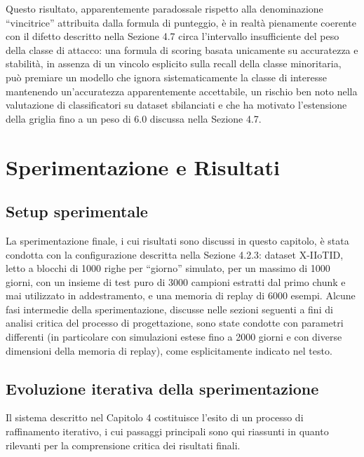 \documentclass[12pt,a4paper]{report}
\begin{document}
Questo risultato, apparentemente paradossale rispetto alla denominazione ``vincitrice'' attribuita dalla formula di punteggio, è in realtà pienamente coerente con il difetto descritto nella Sezione 4.7 circa l'intervallo insufficiente del peso della classe di attacco: una formula di scoring basata unicamente su accuratezza e stabilità, in assenza di un vincolo esplicito sulla recall della classe minoritaria, può premiare un modello che ignora sistematicamente la classe di interesse mantenendo un'accuratezza apparentemente accettabile, un rischio ben noto nella valutazione di classificatori su dataset sbilanciati e che ha motivato l'estensione della griglia fino a un peso di 6.0 discussa nella Sezione 4.7.

\chapter{Sperimentazione e Risultati}

\section{Setup sperimentale}

La sperimentazione finale, i cui risultati sono discussi in questo capitolo, è stata condotta con la configurazione descritta nella Sezione 4.2.3: dataset X-IIoTID, letto a blocchi di 1000 righe per ``giorno'' simulato, per un massimo di 1000 giorni, con un insieme di test puro di 3000 campioni estratti dal primo chunk e mai utilizzato in addestramento, e una memoria di replay di 6000 esempi. Alcune fasi intermedie della sperimentazione, discusse nelle sezioni seguenti a fini di analisi critica del processo di progettazione, sono state condotte con parametri differenti (in particolare con simulazioni estese fino a 2000 giorni e con diverse dimensioni della memoria di replay), come esplicitamente indicato nel testo.

\section{Evoluzione iterativa della sperimentazione}

Il sistema descritto nel Capitolo 4 costituisce l'esito di un processo di raffinamento iterativo, i cui passaggi principali sono qui riassunti in quanto rilevanti per la comprensione critica dei risultati finali.
\end{document}
